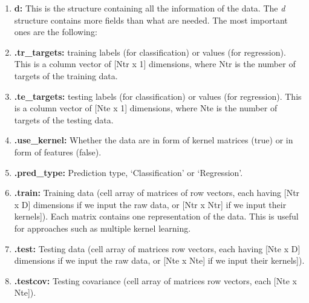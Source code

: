 \begin{enumerate}

\item \textbf{d:} This is the structure containing all the information of the data. The \textit{d} structure contains more fields than what are needed. The most important ones are the following:

\bi

\item \textbf{.tr\_targets:}
training labels (for classification) or values (for regression). This is a column vector of [Ntr x 1] dimensions, where Ntr is the number of targets of the training data.

\item \textbf{.te\_targets:}
testing labels (for classification) or values (for regression). This is a column vector of [Nte x 1] dimensions, where Nte is the number of targets of the testing data.



\item \textbf{.use\_kernel:} Whether the data are in form of kernel matrices (true) or in form of features (false).

\item \textbf{.pred\_type:} Prediction type, `Classification' or `Regression'.



\item \textbf{.train:} Training data (cell array of matrices of row vectors, each having [Ntr x D] dimensions if we input the raw data, or [Ntr x Ntr] if we input their kernels]). Each matrix contains one representation of the data. This is useful for approaches such as multiple kernel learning. %

\item \textbf{.test:} Testing data (cell array of matrices row vectors, each having [Nte x D] dimensions if we input the raw data, or [Nte x Nte] if we input their kernels]). %

\item \textbf{.testcov:} Testing covariance (cell array of matrices row vectors, each [Nte x Nte]).


\end{enumerate}
